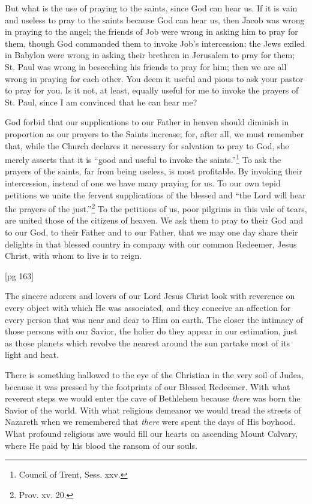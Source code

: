 But what is the use of praying to the saints, since
God can hear us. If it is vain and useless to pray
to the saints because God can hear us, then Jacob
was wrong in praying to the angel; the friends of
Job were wrong in asking him to pray for them,
though God commanded them to invoke Job's intercession;
the Jews exiled in Babylon were wrong
in asking their brethren in Jerusalem to pray for
them; St. Paul was wrong in beseeching his friends
to pray for him; then we are all wrong in praying
for each other. You deem it useful and pious to ask
your pastor to pray for you. Is it not, at least,
equally useful for me to invoke the prayers of St.
Paul, since I am convinced that he can hear me?

God forbid that our supplications to our Father
in heaven should diminish in proportion as our
prayers to the Saints increase; for, after all, we
must remember that, while the Church declares it
necessary for salvation to pray to God, she merely
asserts that it is “good and useful to invoke the
saints.”\footnote{Council of Trent,
Sess. xxv.} To ask the prayers of the saints, far from
being useless, is most profitable. By invoking their
intercession, instead of one we have many praying
for us. To our own tepid petitions we unite the fervent
supplications of the blessed and “the Lord
will hear the prayers of the just.”\footnote{Prov.
xv. 20.} To the petitions
of us, poor pilgrims in this vale of tears, are
united those of the citizens of heaven. We ask
them to pray to their God and to our God, to their
Father and to our Father, that we may one day
share their delights in that blessed country in company
with our common Redeemer, Jesus Christ,
with whom to live is to reign.

[pg 163]



The sincere adorers and lovers of our Lord
Jesus Christ look with reverence on every
object with which He was associated, and
they conceive an affection for every person that
was near and dear to Him on earth. The closer
the intimacy of those persons with our Savior,
the holier do they appear in our estimation, just
as those planets which revolve the nearest around
the sun partake most of its light and heat.

There is something hallowed to the eye of the
Christian in the very soil of Judea, because it was
pressed by the footprints of our Blessed Redeemer.
With what reverent steps we would enter
the cave of Bethlehem because \emph{there} was born
the Savior of the world. With what religious demeanor
we would tread the streets of Nazareth
when we remembered that \emph{there} were spent the
days of His boyhood. What profound religious
awe would fill our hearts on ascending Mount
Calvary, where He paid by his blood the ransom
of our souls.

